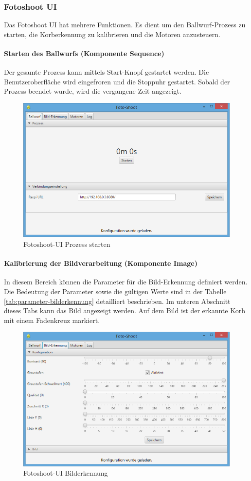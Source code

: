 \subsubsection{Fotoshoot UI}

Das Fotoshoot UI hat mehrere Funktionen. Es dient um den Ballwurf-Prozess zu starten, die Korberkennung zu kalibrieren und die Motoren anzusteuern.

\paragraph{Starten des Ballwurfs (Komponente Sequence)}
Der gesamte Prozess kann mittels Start-Knopf gestartet werden. Die Benutzeroberfläche wird eingefroren und die Stoppuhr gestartet. Sobald der Prozess beendet wurde, wird die vergangene Zeit angezeigt.

\begin{figure}[h!]
\centering
\includegraphics[width=0.6\linewidth]{../../fig/fotoshoot-ui/fotoshoot-ui-pi}
\caption{Fotoshoot-UI Prozess starten}
\label{fig:fotoshoot-ui-pi}
\end{figure}

\paragraph{Kalibrierung der Bildverarbeitung (Komponente Image)}
In diesem Bereich können die Parameter für die Bild-Erkennung definiert werden. Die Bedeutung der Parameter sowie die gültigen Werte sind in der Tabelle \ref{tab:parameter-bilderkennung} detailliert beschrieben. Im unteren Abschnitt dieses Tabs kann das Bild angezeigt werden. Auf dem Bild ist der erkannte Korb mit einem Fadenkreuz markiert.

\begin{figure}[h!]
	\centering
	\includegraphics[width=0.6\linewidth]{../../fig/fotoshoot-ui/fotoshoot-ui-korb-erkennung}
	\caption{Fotoshoot-UI Bilderkennung}
	\label{fig:fotoshoot-ui-korb-erkennung}
\end{figure}

